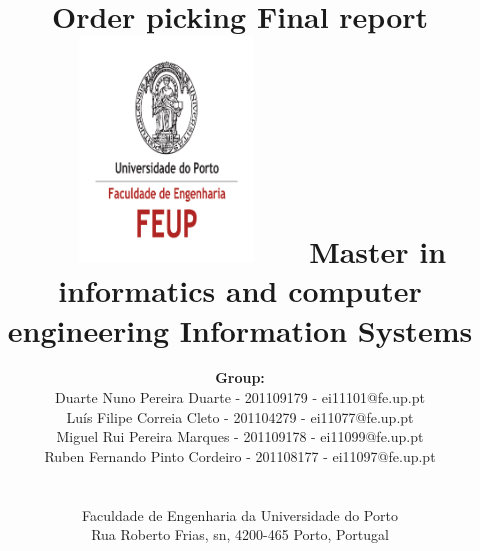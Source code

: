 \documentclass[a4paper]{article}
\begin{document}
\setlength{\textwidth}{16cm}
\setlength{\textheight}{22cm}

\title{\Huge\textbf{Order picking}\linebreak\linebreak\linebreak
\Large\textbf{Final report}\linebreak\linebreak
\includegraphics[height=6cm, width=7cm]{feup.pdf}\linebreak \linebreak
\Large{Master in informatics and computer engineering} \linebreak \linebreak
\Large{Information Systems}\linebreak
}

\author{\textbf{Group:}
\\ Duarte Nuno Pereira Duarte - 201109179 - ei11101@fe.up.pt
\\ Luís Filipe Correia Cleto - 201104279 -  ei11077@fe.up.pt
\\ Miguel Rui Pereira Marques - 201109178 - ei11099@fe.up.pt 
\\ Ruben Fernando Pinto Cordeiro - 201108177 - ei11097@fe.up.pt 
\\\linebreak\linebreak \\
 \\ Faculdade de Engenharia da Universidade do Porto \\ Rua Roberto Frias, s\/n, 4200-465 Porto, Portugal \linebreak\linebreak\linebreak
\linebreak\linebreak\vspace{1cm}}
\maketitle
\thispagestyle{empty}
\nocite{*}
\end{document}
